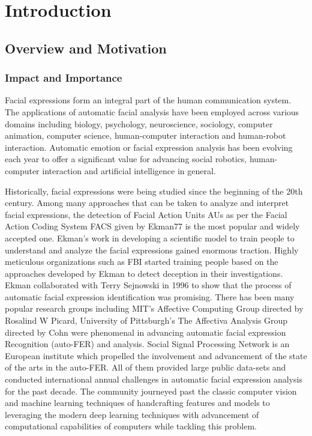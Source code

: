 \chapter{Introduction}


\section{Overview and Motivation}

\subsection{Impact and Importance}
Facial expressions form an integral part of the human communication system. The applications of automatic facial analysis have been employed across various domains including biology, psychology, neuroscience, sociology, computer animation, computer science\cite{survey1}, human-computer interaction\cite{appHCI1} and human-robot interaction\cite{appHRI2}. Automatic emotion or facial expression analysis has been evolving each year to offer a significant value for advancing social robotics, human-computer interaction and artificial intelligence in general\cite{affectiva}.

Historically, facial expressions were being studied since the beginning of the 20th century\cite{book1}. Among many approaches that can be taken to analyze and interpret facial expressions, the detection of Facial Action Units AUs as per the Facial Action Coding System FACS given by Ekman77\cite{facs} is the most popular and widely accepted one. Ekman's work in developing a scientific model to train people to understand and analyze the facial expressions gained enormous traction. Highly meticulous organizations such as FBI started training people based on the approaches developed by Ekman to detect deception in their investigations\cite{ekmanwebsite}. Ekman collaborated with Terry Sejnowski in 1996 to show that the process of automatic facial expression identification was promising\cite{first_auto_facs}. There has been many popular research groups including MIT's Affective Computing Group\cite{mitlab} directed by Rosalind W Picard, University of Pittsburgh's The Affectiva Analysis Group \cite{upitlab} directed by Cohn were phenomenal in advancing automatic facial expression Recognition (auto-FER) and analysis\cite{survey2}. Social Signal Processing Network\cite{sspnet} is an European institute which propelled the involvement and advancement of the state of the arts in the auto-FER. All of them provided large public data-sets and conducted international annual challenges in automatic facial expression analysis for the past decade. The community journeyed past the classic computer vision and machine learning techniques of handcrafting features and models to leveraging the modern deep learning techniques with advancement of computational capabilities of computers while tackling this problem. 

